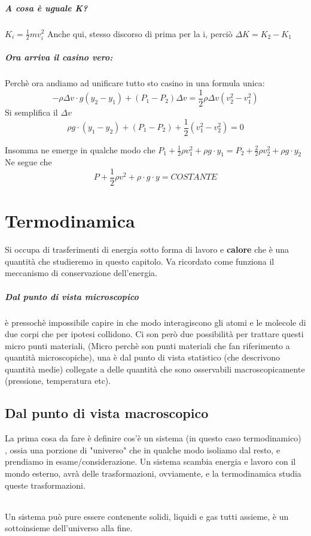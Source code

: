 \documentclass[12pt, a4paper, openany, oneside]{book}
\begin{document}
\paragraph{A cosa è uguale K? } $K_{i} = \frac{1}{2}mv_{i}^{2}$
Anche qui, stesso discorso di prima per la i, perciò $\Delta K = K_{2} - K_{1}$
\paragraph{Ora arriva il casino vero: } Perchè ora andiamo ad unificare tutto 
sto casino in una formula unica:
\[
-\rho \Delta v\cdot g(y_{2} - y_{1}) + (P_{1} - P_{2})\Delta v  = 
\frac{1}{2}\rho \Delta v (v_{2}^{2} - v_{1}^{2})	
\] 
Si semplifica il $\Delta v$
\[
\rho g \cdot (y_1 - y_2) + (P_{1} - P_{2}) + \frac{1}{2}(v_{1}^{2} - 
v_{2}^{2}) = 0
\]	

Insomma ne emerge in qualche modo che 
$P_{1} + \frac{1}{2} \rho v_{1}^{2} + \rho g \cdot y_{1} = P_{2} + \frac{2}{2} \rho
v_{2}^{2} + \rho g \cdot y_{2}$
Ne segue che
\[
P + \frac{1}{2} \rho v^{2} + \rho \cdot g \cdot y = COSTANTE
\]	
\chapter{Termodinamica}
Si occupa di trasferimenti di energia sotto forma di lavoro e \textbf{calore}
che è una quantità che studieremo in questo capitolo. Va ricordato come 
funziona il meccanismo di conservazione dell'energia. 
\paragraph{Dal punto di vista microscopico} è pressochè impossibile capire in 
che modo interagiscono gli atomi e le molecole di due corpi che per ipotesi
collidono. Ci son però due possibilità per trattare questi micro punti materiali,
(Micro perchè son punti materiali che fan riferimento a quantità microscopiche),
una è dal punto di vista statistico (che descrivono quantità medie) collegate a
delle quantità che sono osservabili macroscopicamente (pressione, temperatura 
etc).
\section{Dal punto di vista macroscopico}
La prima cosa da fare è definire cos'è un sistema (in questo caso termodinamico)
, ossia una porzione di "universo" che in qualche modo isoliamo dal resto, e 
prendiamo in esame/considerazione. Un sistema scambia energia e lavoro con il 
mondo esterno, avrà delle trasformazioni, ovviamente, e la termodinamica studia
queste trasformazioni.
\subparagraph{}Un sistema può pure essere contenente solidi, liquidi e gas tutti
assieme, è un sottoinsieme dell'universo alla fine. 
\end{document}
